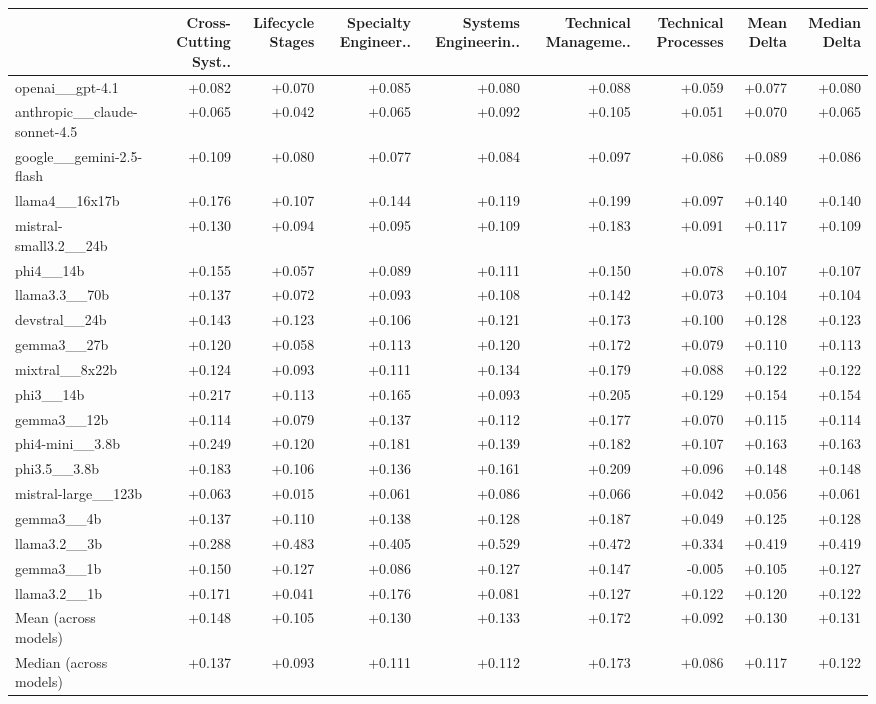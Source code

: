 \begin{tabular}{lrrrrrrrr}
\toprule
 & Cross-Cutting Syst.. & Lifecycle Stages & Specialty Engineer.. & Systems Engineerin.. & Technical Manageme.. & Technical Processes & Mean Delta & Median Delta \\
\midrule
openai\_\_gpt-4.1 & +0.082 & +0.070 & +0.085 & +0.080 & +0.088 & +0.059 & +0.077 & +0.080 \\
anthropic\_\_claude-sonnet-4.5 & +0.065 & +0.042 & +0.065 & +0.092 & +0.105 & +0.051 & +0.070 & +0.065 \\
google\_\_gemini-2.5-flash & +0.109 & +0.080 & +0.077 & +0.084 & +0.097 & +0.086 & +0.089 & +0.086 \\
llama4\_\_16x17b & +0.176 & +0.107 & +0.144 & +0.119 & +0.199 & +0.097 & +0.140 & +0.140 \\
mistral-small3.2\_\_24b & +0.130 & +0.094 & +0.095 & +0.109 & +0.183 & +0.091 & +0.117 & +0.109 \\
phi4\_\_14b & +0.155 & +0.057 & +0.089 & +0.111 & +0.150 & +0.078 & +0.107 & +0.107 \\
llama3.3\_\_70b & +0.137 & +0.072 & +0.093 & +0.108 & +0.142 & +0.073 & +0.104 & +0.104 \\
devstral\_\_24b & +0.143 & +0.123 & +0.106 & +0.121 & +0.173 & +0.100 & +0.128 & +0.123 \\
gemma3\_\_27b & +0.120 & +0.058 & +0.113 & +0.120 & +0.172 & +0.079 & +0.110 & +0.113 \\
mixtral\_\_8x22b & +0.124 & +0.093 & +0.111 & +0.134 & +0.179 & +0.088 & +0.122 & +0.122 \\
phi3\_\_14b & +0.217 & +0.113 & +0.165 & +0.093 & +0.205 & +0.129 & +0.154 & +0.154 \\
gemma3\_\_12b & +0.114 & +0.079 & +0.137 & +0.112 & +0.177 & +0.070 & +0.115 & +0.114 \\
phi4-mini\_\_3.8b & +0.249 & +0.120 & +0.181 & +0.139 & +0.182 & +0.107 & +0.163 & +0.163 \\
phi3.5\_\_3.8b & +0.183 & +0.106 & +0.136 & +0.161 & +0.209 & +0.096 & +0.148 & +0.148 \\
mistral-large\_\_123b & +0.063 & +0.015 & +0.061 & +0.086 & +0.066 & +0.042 & +0.056 & +0.061 \\
gemma3\_\_4b & +0.137 & +0.110 & +0.138 & +0.128 & +0.187 & +0.049 & +0.125 & +0.128 \\
llama3.2\_\_3b & +0.288 & +0.483 & +0.405 & +0.529 & +0.472 & +0.334 & +0.419 & +0.419 \\
gemma3\_\_1b & +0.150 & +0.127 & +0.086 & +0.127 & +0.147 & -0.005 & +0.105 & +0.127 \\
llama3.2\_\_1b & +0.171 & +0.041 & +0.176 & +0.081 & +0.127 & +0.122 & +0.120 & +0.122 \\
Mean (across models) & +0.148 & +0.105 & +0.130 & +0.133 & +0.172 & +0.092 & +0.130 & +0.131 \\
Median (across models) & +0.137 & +0.093 & +0.111 & +0.112 & +0.173 & +0.086 & +0.117 & +0.122 \\
\bottomrule
\end{tabular}
